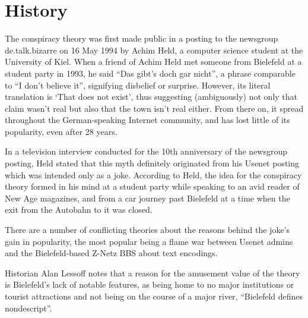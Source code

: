 \section{History}

The conspiracy theory was first made public in a posting to the newsgroup de.talk.bizarre on 16 May 1994 by Achim Held, a computer science student at the University of Kiel. When a friend of Achim Held met someone from Bielefeld at a student party in 1993, he said \enquote{Das gibt's doch gar nicht}, a phrase comparable to \enquote{I don't believe it}, signifying disbelief or surprise. However, its literal translation is \enquote*{That does not exist}, thus suggesting (ambiguously) not only that claim wasn't real but also that the town isn't real either. From there on, it spread throughout the German-speaking Internet community, and has lost little of its popularity, even after 28 years.

In a television interview conducted for the 10th anniversary of the newsgroup posting, Held stated that this myth definitely originated from his Usenet posting which was intended only as a joke. According to Held, the idea for the conspiracy theory formed in his mind at a student party while speaking to an avid reader of New Age magazines, and from a car journey past Bielefeld at a time when the exit from the Autobahn to it was closed.

There are a number of conflicting theories about the reasons behind the joke's gain in popularity, the most popular being a flame war between Usenet admins and the Bielefeld-based Z-Netz BBS about text encodings.

Historian Alan Lessoff notes that a reason for the amusement value of the theory is Bielefeld's lack of notable features, as being home to no major institutions or tourist attractions and not being on the course of a major river, \enquote{Bielefeld defines nondescript}.
